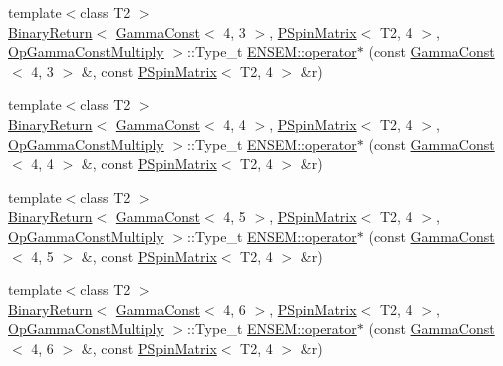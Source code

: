 \begin{DoxyCompactItemize}
\item 
{\footnotesize template$<$class T2 $>$ }\\\mbox{\hyperlink{structENSEM_1_1BinaryReturn}{Binary\+Return}}$<$ \mbox{\hyperlink{classENSEM_1_1GammaConst}{Gamma\+Const}}$<$ 4, 3 $>$, \mbox{\hyperlink{classENSEM_1_1PSpinMatrix}{P\+Spin\+Matrix}}$<$ T2, 4 $>$, \mbox{\hyperlink{structENSEM_1_1OpGammaConstMultiply}{Op\+Gamma\+Const\+Multiply}} $>$\+::Type\+\_\+t \mbox{\hyperlink{group__primspinmatrix_gaeffd66ff58d2cd7122d34c77e7109255}{E\+N\+S\+E\+M\+::operator$\ast$}} (const \mbox{\hyperlink{classENSEM_1_1GammaConst}{Gamma\+Const}}$<$ 4, 3 $>$ \&, const \mbox{\hyperlink{classENSEM_1_1PSpinMatrix}{P\+Spin\+Matrix}}$<$ T2, 4 $>$ \&r)
\item 
{\footnotesize template$<$class T2 $>$ }\\\mbox{\hyperlink{structENSEM_1_1BinaryReturn}{Binary\+Return}}$<$ \mbox{\hyperlink{classENSEM_1_1GammaConst}{Gamma\+Const}}$<$ 4, 4 $>$, \mbox{\hyperlink{classENSEM_1_1PSpinMatrix}{P\+Spin\+Matrix}}$<$ T2, 4 $>$, \mbox{\hyperlink{structENSEM_1_1OpGammaConstMultiply}{Op\+Gamma\+Const\+Multiply}} $>$\+::Type\+\_\+t \mbox{\hyperlink{group__primspinmatrix_gabc287f892d11c49158f8022c393a8516}{E\+N\+S\+E\+M\+::operator$\ast$}} (const \mbox{\hyperlink{classENSEM_1_1GammaConst}{Gamma\+Const}}$<$ 4, 4 $>$ \&, const \mbox{\hyperlink{classENSEM_1_1PSpinMatrix}{P\+Spin\+Matrix}}$<$ T2, 4 $>$ \&r)
\item 
{\footnotesize template$<$class T2 $>$ }\\\mbox{\hyperlink{structENSEM_1_1BinaryReturn}{Binary\+Return}}$<$ \mbox{\hyperlink{classENSEM_1_1GammaConst}{Gamma\+Const}}$<$ 4, 5 $>$, \mbox{\hyperlink{classENSEM_1_1PSpinMatrix}{P\+Spin\+Matrix}}$<$ T2, 4 $>$, \mbox{\hyperlink{structENSEM_1_1OpGammaConstMultiply}{Op\+Gamma\+Const\+Multiply}} $>$\+::Type\+\_\+t \mbox{\hyperlink{group__primspinmatrix_ga1fbaa359542d933fd3150bbcdf5006d5}{E\+N\+S\+E\+M\+::operator$\ast$}} (const \mbox{\hyperlink{classENSEM_1_1GammaConst}{Gamma\+Const}}$<$ 4, 5 $>$ \&, const \mbox{\hyperlink{classENSEM_1_1PSpinMatrix}{P\+Spin\+Matrix}}$<$ T2, 4 $>$ \&r)
\item 
{\footnotesize template$<$class T2 $>$ }\\\mbox{\hyperlink{structENSEM_1_1BinaryReturn}{Binary\+Return}}$<$ \mbox{\hyperlink{classENSEM_1_1GammaConst}{Gamma\+Const}}$<$ 4, 6 $>$, \mbox{\hyperlink{classENSEM_1_1PSpinMatrix}{P\+Spin\+Matrix}}$<$ T2, 4 $>$, \mbox{\hyperlink{structENSEM_1_1OpGammaConstMultiply}{Op\+Gamma\+Const\+Multiply}} $>$\+::Type\+\_\+t \mbox{\hyperlink{group__primspinmatrix_ga6159ef586816bd93e368fd7d18f601ad}{E\+N\+S\+E\+M\+::operator$\ast$}} (const \mbox{\hyperlink{classENSEM_1_1GammaConst}{Gamma\+Const}}$<$ 4, 6 $>$ \&, const \mbox{\hyperlink{classENSEM_1_1PSpinMatrix}{P\+Spin\+Matrix}}$<$ T2, 4 $>$ \&r)

\end{DoxyCompactItemize}
